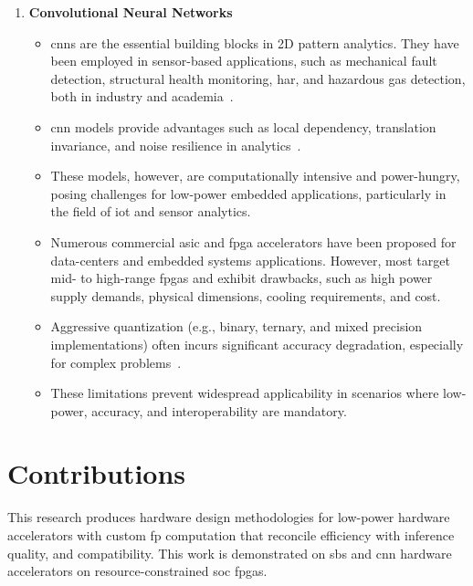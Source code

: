 \begin{enumerate}[label={\textbf{S\arabic*}}]
	\item \textbf{Convolutional Neural Networks}
	\begin{itemize}
		\item \glspl{cnn} are the essential building blocks in 2D pattern analytics. They have been employed in sensor-based applications, such as mechanical fault detection, structural health monitoring, \gls{har}, and hazardous gas detection, both in industry and academia~\cite{li2019sensor,dong2018rolling,nagayama2007structural,wang2019deep,kim2017hazardous}.
		\item \gls{cnn} models provide advantages such as local dependency, translation invariance, and noise resilience in analytics~\cite{du2014leveraging}.
		\item These models, however, are computationally intensive and power-hungry, posing challenges for low-power embedded applications, particularly in the field of \gls{iot} and sensor analytics.
		\item Numerous commercial \gls{asic} and \gls{fpga} accelerators have been proposed for data-centers and embedded systems applications. However, most target mid- to high-range \glspl{fpga} and exhibit drawbacks, such as high power supply demands, physical dimensions, cooling requirements, and cost.
		\item Aggressive quantization (e.g., binary, ternary, and mixed precision implementations) often incurs significant accuracy degradation, especially for complex problems~\cite{courbariaux2015binaryconnect,lin2015neural,colangelo2018exploration,faraone2019addnet}.
		\item These limitations prevent widespread applicability in scenarios where low-power, accuracy, and interoperability are mandatory.
	\end{itemize}
	
\end{enumerate}

\section{Contributions}

This research produces hardware design methodologies for low-power hardware accelerators with custom \gls{fp} computation that reconcile efficiency with inference quality, and compatibility. This work is demonstrated on \gls{sbs} and \gls{cnn} hardware accelerators on resource-constrained \gls{soc} \glspl{fpga}.


